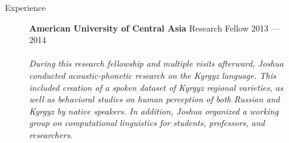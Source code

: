 \documentclass{cv} %
\begin{document}
\begin{rSection}{Experience}
  \begin{figure}[H]
    \begin{minipage}{0.2\textwidth}
      \centering
      
    \end{minipage}
    \begin{minipage}{0.8\textwidth}
      {\bf American University of Central Asia} \hfill Research Fellow  \hspace{0.5cm} {2013 --- 2014} \\ \\
      \textit{During this research fellowship and multiple visits afterward, Joshua conducted acoustic-phonetic research on the Kyrgyz language. This included creation of a spoken dataset of Kyrgyz regional varieties, as well as behavioral studies on human perception of both Russian and Kyrgyz by native speakers. In addition, Joshua organized a working group on computational linguistics for students, professors, and researchers.}
    \end{minipage}
  \end{figure}

\end{rSection}
\end{document}
